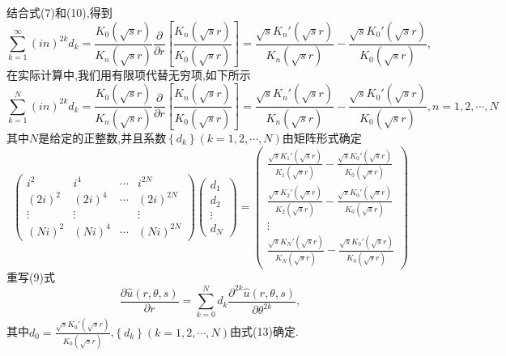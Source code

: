 \documentclass[a4paper,15pt,twoside,zihao=-4]{article}
\begin{document}
\indent 结合式(7)和(10),得到
\begin{equation}
\sum_{k=1}^{\infty } (in)^{2k}d_k=\frac{K_0(\sqrt{s}r )}{K_n(\sqrt{s}r )}
\frac{\partial }{\partial r}\left [\frac{K_n(\sqrt{s}r )}{K_0(\sqrt{s}r )}\right ]
= \frac{\sqrt{s}{K_n}'(\sqrt{s}r )}{K_n(\sqrt{s}r )}-\frac{\sqrt{s}{K_0}'(\sqrt{s}r )}{K_0(\sqrt{s}r )},
\end{equation}
\indent 在实际计算中,我们用有限项代替无穷项,如下所示
\begin{equation}
\sum_{k=1}^{N} (in)^{2k}d_k=\frac{K_0(\sqrt{s}r )}{K_n(\sqrt{s}r )}
\frac{\partial }{\partial r}\left [\frac{K_n(\sqrt{s}r )}{K_0(\sqrt{s}r )}\right ]
= \frac{\sqrt{s}{K_n}'(\sqrt{s}r )}{K_n(\sqrt{s}r )}-\frac{\sqrt{s}{K_0}'(\sqrt{s}r )}{K_0(\sqrt{s}r )},n=1,2,\cdots,N
\end{equation}
其中$N$是给定的正整数,并且系数$\left \{d_k\right \}(k=1,2,\cdots,N)$由矩阵形式确定
\begin{equation}
\begin{pmatrix}
i^2& i^4&\cdots&i^{2N} \\
 (2i)^2 & (2i)^4&\cdots&(2i)^{2N}\\
 \vdots  & \vdots  &  & \vdots \\
(Ni)^2 & (Ni)^4&\cdots&(Ni)^{2N}
\end{pmatrix}
\begin{pmatrix}
 d_1\\
 d_2\\
 \vdots \\
d_N
\end{pmatrix}=
\begin{pmatrix}
 \frac{\sqrt{s}{K_1}'(\sqrt{s}r )}{K_1(\sqrt{s}r )}-\frac{\sqrt{s}{K_0}'(\sqrt{s}r )}{K_0(\sqrt{s}r )}\\
 \frac{\sqrt{s}{K_2}'(\sqrt{s}r )}{K_2(\sqrt{s}r )}-\frac{\sqrt{s}{K_0}'(\sqrt{s}r )}{K_0(\sqrt{s}r )}\\
 \vdots\\
\frac{\sqrt{s}{K_N}'(\sqrt{s}r )}{K_N(\sqrt{s}r )}-\frac{\sqrt{s}{K_0}'(\sqrt{s}r )}{K_0(\sqrt{s}r )}
\end{pmatrix}
\end{equation}
\indent 重写(9)式
\begin{equation}
\frac{\partial \hat{u}(r,\theta,s)}{\partial r}=
\sum_{k=0}^{N}d_k
\frac{\partial^{2k} \hat{u}(r,\theta,s)}{\partial \theta^{2k}},
\end{equation}
其中$d_0=\frac{\sqrt{s}{K_0}'(\sqrt{s}r )}{K_0(\sqrt{s}r )}$,$\left \{d_k\right \}(k=1,2,\cdots,N)$由式(13)确定.\\
\end{document}
